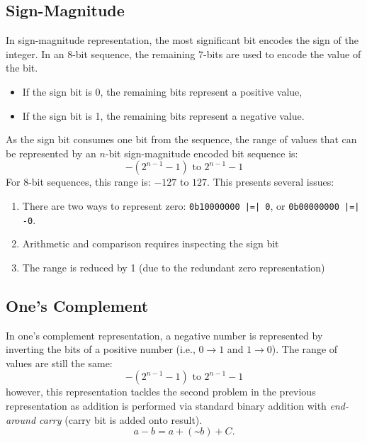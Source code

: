 \documentclass[a4paper]{report}
\begin{document}
\subsection{Sign-Magnitude}
In sign-magnitude representation, the most significant bit encodes the sign of the
integer. In an 8-bit sequence, the remaining 7-bits are used to
encode the value of the bit.
\begin{itemize}
    \item If the sign bit is 0, the remaining bits represent a positive value,
    \item If the sign bit is 1, the remaining bits represent a negative value.
\end{itemize}
As the sign bit consumes one bit from the sequence, the range of values that can be
represented by an \(n\)-bit sign-magnitude encoded bit sequence is:
\begin{equation*}
    -\left( 2^{n - 1} - 1 \right) \text{ to } 2^{n - 1} - 1
\end{equation*}
For 8-bit sequences, this range is: \(-127\) to \(127\).
This presents several issues:
\begin{enumerate}
    \item There are two ways to represent zero: \texttt{0b10000000 |=| 0}, or \texttt{0b00000000 |=| -0}.
    \item Arithmetic and comparison requires inspecting the sign bit
    \item The range is reduced by 1 (due to the redundant zero representation)
\end{enumerate}
\subsection{One's Complement}
In one's complement representation, a negative number is represented by
inverting the bits of a positive number (i.e., \(0 \to 1\) and \(1 \to 0\)).
The range of values are still the same:
\begin{equation*}
    -\left( 2^{n - 1} - 1 \right) \text{ to } 2^{n - 1} - 1
\end{equation*}
however, this representation tackles the second problem in the previous representation as
addition is performed via standard binary addition with \textit{end-around carry} (carry bit is added onto result).
\begin{equation*}
    a - b = a + \left( \text{\textasciitilde} b \right) + C.
\end{equation*}
\end{document}
